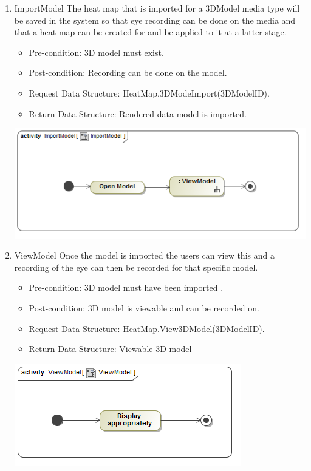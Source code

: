 	\begin{enumerate}
		\item{ImportModel}
		\newline
		The heat map that is imported for a 3DModel media type will be saved in the system so that eye recording can be done on the media and that a heat map can be created for and be applied to it at a latter stage.
		\begin{itemize}
			\item Pre-condition: 3D model must exist.
			\item Post-condition: Recording can be done on the model.
			\item Request Data Structure: HeatMap.3DModeImport(3DModelID).
			\item Return Data Structure: Rendered data model is imported.
		\end{itemize}
		\includegraphics[scale=0.5]{Diagrams/Activity_Diagram__ImportModel__ImportModel.png}

		\item{ViewModel}
		Once the model is imported the users can view this and a recording of the eye can then be recorded for that specific model.
		\begin{itemize}
			\item Pre-condition: 3D model must have been imported .
			\item Post-condition: 3D model is viewable and can be recorded on.
			\item Request Data Structure: HeatMap.View3DModel(3DModelID).
			\item Return Data Structure: Viewable 3D model
		\end{itemize}
		
		\includegraphics[scale=0.5]{Diagrams/Activity_Diagram__ViewModel__ViewModel.png}


\end{enumerate}

